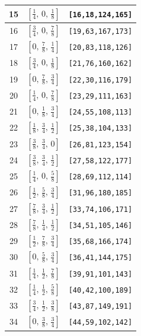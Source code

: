 \documentclass[fleqn,8pt]{jsarticle}
\begin{document}
\begin{longtable}{ccc}
15 & $\left[ \frac{1}{4},\, 0,\, \frac{1}{8} \right]$ & {\tt [16,18,124,165]} \\ \hline
16 & $\left[ \frac{3}{4},\, 0,\, \frac{7}{8} \right]$ & {\tt [19,63,167,173]} \\ \hline
17 & $\left[ 0,\, \frac{7}{8},\, \frac{1}{4} \right]$ & {\tt [20,83,118,126]} \\ \hline
18 & $\left[ \frac{3}{4},\, 0,\, \frac{1}{8} \right]$ & {\tt [21,76,160,162]} \\ \hline
19 & $\left[ 0,\, \frac{7}{8},\, \frac{3}{4} \right]$ & {\tt [22,30,116,179]} \\ \hline
20 & $\left[ \frac{1}{4},\, 0,\, \frac{7}{8} \right]$ & {\tt [23,29,111,163]} \\ \hline
21 & $\left[ 0,\, \frac{1}{8},\, \frac{3}{4} \right]$ & {\tt [24,55,108,113]} \\ \hline
22 & $\left[ \frac{1}{8},\, \frac{3}{4},\, \frac{1}{2} \right]$ & {\tt [25,38,104,133]} \\ \hline
23 & $\left[ \frac{3}{8},\, \frac{3}{4},\, 0 \right]$ & {\tt [26,81,123,154]} \\ \hline
24 & $\left[ \frac{3}{8},\, \frac{3}{4},\, \frac{1}{2} \right]$ & {\tt [27,58,122,177]} \\ \hline
25 & $\left[ \frac{1}{4},\, 0,\, \frac{5}{8} \right]$ & {\tt [28,69,112,114]} \\ \hline
26 & $\left[ \frac{1}{2},\, \frac{5}{8},\, \frac{3}{4} \right]$ & {\tt [31,96,180,185]} \\ \hline
27 & $\left[ \frac{7}{8},\, \frac{3}{4},\, \frac{1}{2} \right]$ & {\tt [33,74,106,171]} \\ \hline
28 & $\left[ \frac{7}{8},\, \frac{1}{4},\, \frac{1}{2} \right]$ & {\tt [34,51,105,146]} \\ \hline
29 & $\left[ \frac{1}{2},\, \frac{7}{8},\, \frac{3}{4} \right]$ & {\tt [35,68,166,174]} \\ \hline
30 & $\left[ 0,\, \frac{5}{8},\, \frac{3}{4} \right]$ & {\tt [36,41,144,175]} \\ \hline
31 & $\left[ \frac{1}{4},\, \frac{1}{2},\, \frac{7}{8} \right]$ & {\tt [39,91,101,143]} \\ \hline
32 & $\left[ \frac{1}{4},\, \frac{1}{2},\, \frac{5}{8} \right]$ & {\tt [40,42,100,189]} \\ \hline
33 & $\left[ \frac{3}{4},\, \frac{1}{2},\, \frac{3}{8} \right]$ & {\tt [43,87,149,191]} \\ \hline
34 & $\left[ 0,\, \frac{3}{8},\, \frac{3}{4} \right]$ & {\tt [44,59,102,142]} \\ \hline

\end{longtable}
\end{document}
